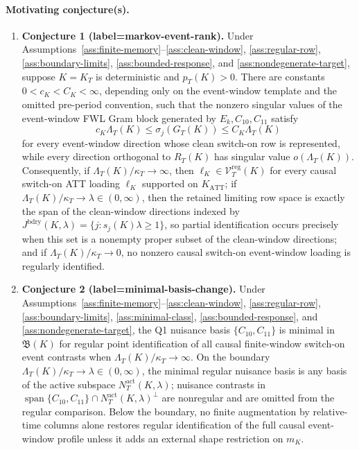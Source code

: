 \documentclass[11pt]{article}
\theoremstyle{definition}
\theoremstyle{plain}
\theoremstyle{remark}
\begin{document}
\paragraph{Motivating conjecture(s).}
\begin{enumerate}[leftmargin=*]
\item \textbf{Conjecture 1 (label=markov-event-rank).}
Under Assumptions~\ref{ass:finite-memory}--\ref{ass:clean-window}, \ref{ass:regular-row}, \ref{ass:boundary-limits}, \ref{ass:bounded-response}, and \ref{ass:nondegenerate-target}, suppose \(K=K_T\) is deterministic and \(p_T(K)>0\).
There are constants \(0<c_K<C_K<\infty\), depending only on the event-window template and the omitted pre-period convention, such that the nonzero singular values of the event-window FWL Gram block generated by \(E_k,C_{10},C_{11}\) satisfy
\[
c_K\Lambda_T(K)\le \sigma_j(G_T(K))\le C_K\Lambda_T(K)
\]
for every event-window direction whose clean switch-on row is represented, while every direction orthogonal to \(R_T(K)\) has singular value \(o(\Lambda_T(K))\).
Consequently, if \(\Lambda_T(K)/\kappa_T\to\infty\), then \(\ell_K\in\mathcal V_T^{\mathrm{reg}}(K)\) for every causal switch-on ATT loading \(\ell_K\) supported on \(K_{\mathrm{ATT}}\); if \(\Lambda_T(K)/\kappa_T\to\lambda\in(0,\infty)\), then the retained limiting row space is exactly the span of the clean-window directions indexed by \(J^{\mathrm{bdry}}(K,\lambda)=\{j:s_j(K)\lambda\ge1\}\), so partial identification occurs precisely when this set is a nonempty proper subset of the clean-window directions; and if \(\Lambda_T(K)/\kappa_T\to0\), no nonzero causal switch-on event-window loading is regularly identified.

\item \textbf{Conjecture 2 (label=minimal-basis-change).}
Under Assumptions~\ref{ass:finite-memory}--\ref{ass:clean-window}, \ref{ass:regular-row}, \ref{ass:boundary-limits}, \ref{ass:minimal-class}, \ref{ass:bounded-response}, and \ref{ass:nondegenerate-target}, the Q1 nuisance basis \(\{C_{10},C_{11}\}\) is minimal in \(\mathfrak B(K)\) for regular point identification of all causal finite-window switch-on event contrasts when \(\Lambda_T(K)/\kappa_T\to\infty\).
On the boundary \(\Lambda_T(K)/\kappa_T\to\lambda\in(0,\infty)\), the minimal regular nuisance basis is any basis of the active subspace \(N_T^{\mathrm{act}}(K,\lambda)\); nuisance contrasts in \(\operatorname{span}\{C_{10},C_{11}\}\cap N_T^{\mathrm{act}}(K,\lambda)^\perp\) are nonregular and are omitted from the regular comparison.
Below the boundary, no finite augmentation by relative-time columns alone restores regular identification of the full causal event-window profile unless it adds an external shape restriction on \(m_K\).
\end{enumerate}
\end{document}
